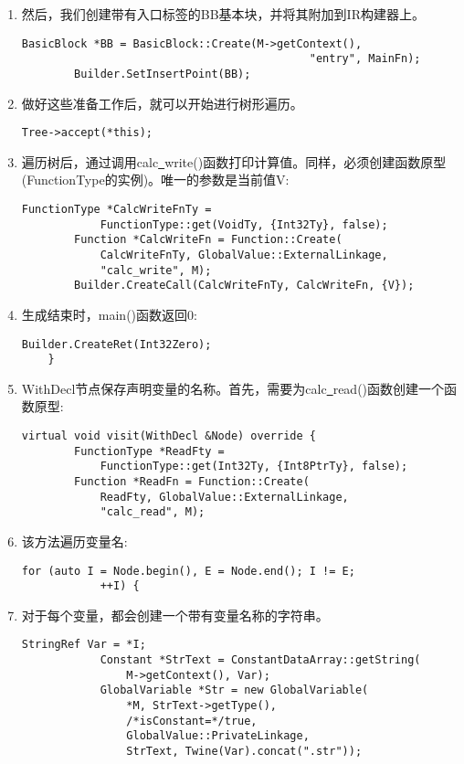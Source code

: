 \begin{enumerate}
\item 然后，我们创建带有入口标签的BB基本块，并将其附加到IR构建器上。
\begin{lstlisting}[caption={}]
		BasicBlock *BB = BasicBlock::Create(M->getContext(),
											"entry", MainFn);
		Builder.SetInsertPoint(BB);
\end{lstlisting}

\item 做好这些准备工作后，就可以开始进行树形遍历。
\begin{lstlisting}[caption={}]
		Tree->accept(*this);
\end{lstlisting}

\item 遍历树后，通过调用calc\underline{~}write()函数打印计算值。同样，必须创建函数原型(FunctionType的实例)。唯一的参数是当前值V:
\begin{lstlisting}[caption={}]
		FunctionType *CalcWriteFnTy =
			FunctionType::get(VoidTy, {Int32Ty}, false);
		Function *CalcWriteFn = Function::Create(
			CalcWriteFnTy, GlobalValue::ExternalLinkage,
			"calc_write", M);
		Builder.CreateCall(CalcWriteFnTy, CalcWriteFn, {V});
\end{lstlisting}

\item 生成结束时，main()函数返回0:
\begin{lstlisting}[caption={}]
		Builder.CreateRet(Int32Zero);
	}
\end{lstlisting}

\item WithDecl节点保存声明变量的名称。首先，需要为calc\underline{~}read()函数创建一个函数原型:
\begin{lstlisting}[caption={}]
	virtual void visit(WithDecl &Node) override {
		FunctionType *ReadFty =
			FunctionType::get(Int32Ty, {Int8PtrTy}, false);
		Function *ReadFn = Function::Create(
			ReadFty, GlobalValue::ExternalLinkage,
			"calc_read", M);
\end{lstlisting}

\item 该方法遍历变量名:
\begin{lstlisting}[caption={}]
		for (auto I = Node.begin(), E = Node.end(); I != E;
			++I) {
\end{lstlisting}

\item 对于每个变量，都会创建一个带有变量名称的字符串。
\begin{lstlisting}[caption={}]
			StringRef Var = *I;
			Constant *StrText = ConstantDataArray::getString(
				M->getContext(), Var);
			GlobalVariable *Str = new GlobalVariable(
				*M, StrText->getType(),
				/*isConstant=*/true,
				GlobalValue::PrivateLinkage,
				StrText, Twine(Var).concat(".str"));
\end{lstlisting}


\end{enumerate}
